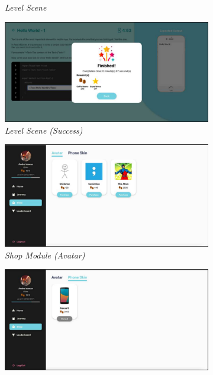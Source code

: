 \begin{figure}[H]
\begin{subfigure}[b]{0.4\textwidth}
		\caption{\textit{Level Scene}}
		\label{fig:sub-andre-a6}
	\end{subfigure}
	\begin{subfigure}[b]{0.4\textwidth}
		\centering
		\includegraphics[width=\linewidth]{contents/chapter-2/images/Andre-a7.png}
		\caption{\textit{ Level Scene (Success)}}
		\label{fig:sub-andre-a7}
	\end{subfigure}
	\hfill
	\begin{subfigure}[b]{0.4\textwidth}
		\centering
		\includegraphics[width=\linewidth]{contents/chapter-2/images/Andre-a8.png}
		\caption{\textit{ Shop Module (Avatar) }}
		\label{fig:sub-andre-a8}
	\end{subfigure}  
	\begin{subfigure}[b]{0.4\textwidth}
		\centering
		\includegraphics[width=\linewidth]{contents/chapter-2/images/Andre-a9.png}

\end{subfigure}
\end{figure}
